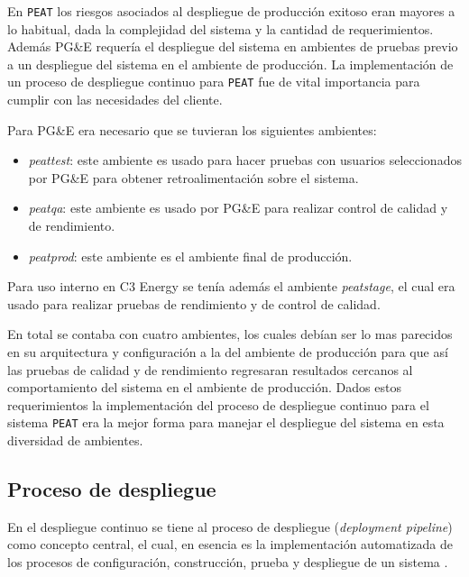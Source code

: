 En \texttt{PEAT} los riesgos asociados al despliegue de producción exitoso
eran mayores a lo habitual, dada la complejidad del sistema y la cantidad
de requerimientos. Además PG\&E requería el despliegue del sistema en ambientes
de pruebas previo a un despliegue del sistema en el ambiente de producción.
La implementación de un proceso de despliegue continuo para \texttt{PEAT} fue de
vital importancia para cumplir con las necesidades del cliente.

\vspace{2.5mm}

Para PG\&E era necesario que se tuvieran los siguientes ambientes:
\begin{itemize}
\item \textit{peattest}: este ambiente es usado para hacer pruebas con usuarios
  seleccionados por PG\&E para obtener retroalimentación sobre el sistema.
\item \textit{peatqa}: este ambiente es usado por PG\&E para realizar control de
  calidad y de rendimiento.
\item \textit{peatprod}: este ambiente es el ambiente final de producción.
\end{itemize}

Para uso interno en C3 Energy se tenía además el ambiente \textit{peatstage},
el cual era usado para realizar pruebas de rendimiento y de control de calidad.

En total se contaba con cuatro ambientes, los cuales debían ser lo mas parecidos
en su arquitectura y configuración a la del ambiente de producción para que así las
pruebas de calidad y de rendimiento regresaran resultados cercanos al comportamiento
del sistema en el ambiente de producción.
Dados estos requerimientos la implementación del proceso de despliegue continuo para
el sistema \texttt{PEAT} era la mejor forma para manejar el despliegue del sistema
en esta diversidad de ambientes.

\subsection{Proceso de despliegue}

En el despliegue continuo se tiene al proceso de despliegue (\textit{deployment
  pipeline}) como concepto central, el cual, en esencia es la implementación
automatizada de los procesos de configuración, construcción, prueba y despliegue de
un sistema \cite{28_humble_farley_2011}.

\vspace{2.5mm}


